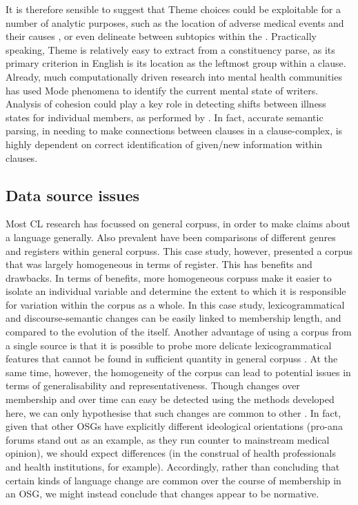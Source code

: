 %
\noindent It is therefore sensible to suggest that \gls{Theme} choices could be exploitable for a number of analytic purposes, such as the location of adverse medical events and their causes \cite{chee2011predicting}, or even delineate between subtopics within the . Practically speaking, Theme is relatively easy to extract from a constituency parse, as its primary criterion in English is its location as the leftmost group within a clause. Already, much computationally driven research into mental health communities has used Mode phenomena to identify the current mental state of writers. Analysis of cohesion could play a key role in detecting shifts between illness states for individual members, as performed by \textcite{maclean_forum77:_2015}. In fact, accurate semantic parsing, in needing to make connections between clauses in a clause\hyp{}complex, is highly dependent on correct identification of given\slash new information within clauses.


\subsection{Data source issues}

Most \gls{CL} research has focussed on general \glspl{corpus}, in order to make claims about a language generally. Also prevalent have been comparisons of different genres and registers within general \glspl{corpus}. This case study, however, presented a \gls{corpus} that was largely homogeneous in terms of register. This has benefits and drawbacks. In terms of benefits, more homogeneous \glspl{corpus} make it easier to isolate an individual variable and determine the extent to which it is responsible for variation within the corpus as a whole. In this case study, lexicogrammatical and \gls{discourse-semantic} changes can be easily linked to membership length, and compared to the evolution of the  itself. Another advantage of using a \gls{corpus} from a single source is that it is possible to probe more delicate lexicogrammatical features that cannot be found in sufficient quantity in general \glspl{corpus} \cite{zinn_changing_2015}. At the same time, however, the homogeneity of the corpus can lead to potential issues in terms of generalisability and representativeness. Though changes over membership and over time can easy be detected using the methods developed here, we can only hypothesise that such changes are common to other . In fact, given that other \glspl{OSG} have explicitly different ideological orientations (pro\hyp{}ana \glspl{forum} stand out as an example, as they run counter to mainstream medical opinion), we should expect differences (in the construal of health professionals and health institutions, for example). Accordingly, rather than concluding that certain kinds of language change are common over the course of membership in an \gls{OSG}, we might instead conclude that changes appear to be normative.

